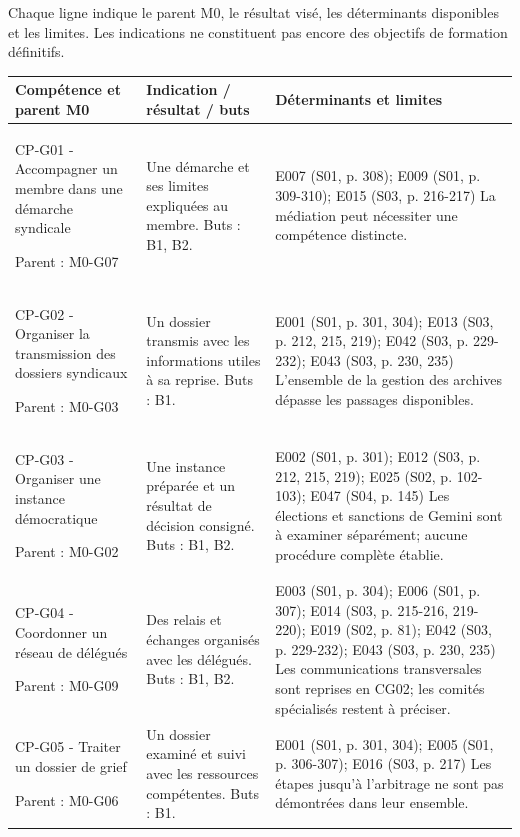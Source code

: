 \documentclass[9pt,a4paper,landscape]{extarticle}
\begin{document}
\par
\small Chaque ligne indique le parent M0, le résultat visé, les déterminants disponibles et les limites. Les indications ne constituent pas encore des objectifs de formation définitifs.\par
\renewcommand{\arraystretch}{1.12}\begin{longtable}{|p{61mm}|p{84mm}|p{115mm}|}\hline\rowcolor{pale}\textbf{Compétence et parent M0} & \textbf{Indication / résultat / buts} & \textbf{Déterminants et limites}\\\hline\endhead
CP-G01 - Accompagner un membre dans une démarche syndicale\par Parent : M0-G07 & Une démarche et ses limites expliquées au membre. Buts : B1, B2. & E007 (S01, p. 308); E009 (S01, p. 309-310); E015 (S03, p. 216-217) La médiation peut nécessiter une compétence distincte.\\\hline
CP-G02 - Organiser la transmission des dossiers syndicaux\par Parent : M0-G03 & Un dossier transmis avec les informations utiles à sa reprise. Buts : B1. & E001 (S01, p. 301, 304); E013 (S03, p. 212, 215, 219); E042 (S03, p. 229-232); E043 (S03, p. 230, 235) L’ensemble de la gestion des archives dépasse les passages disponibles.\\\hline
CP-G03 - Organiser une instance démocratique\par Parent : M0-G02 & Une instance préparée et un résultat de décision consigné. Buts : B1, B2. & E002 (S01, p. 301); E012 (S03, p. 212, 215, 219); E025 (S02, p. 102-103); E047 (S04, p. 145) Les élections et sanctions de Gemini sont à examiner séparément; aucune procédure complète établie.\\\hline
CP-G04 - Coordonner un réseau de délégués\par Parent : M0-G09 & Des relais et échanges organisés avec les délégués. Buts : B1, B2. & E003 (S01, p. 304); E006 (S01, p. 307); E014 (S03, p. 215-216, 219-220); E019 (S02, p. 81); E042 (S03, p. 229-232); E043 (S03, p. 230, 235) Les communications transversales sont reprises en CG02; les comités spécialisés restent à préciser.\\\hline
CP-G05 - Traiter un dossier de grief\par Parent : M0-G06 & Un dossier examiné et suivi avec les ressources compétentes. Buts : B1. & E001 (S01, p. 301, 304); E005 (S01, p. 306-307); E016 (S03, p. 217) Les étapes jusqu’à l’arbitrage ne sont pas démontrées dans leur ensemble.\\\hline

\end{longtable}
\end{document}
